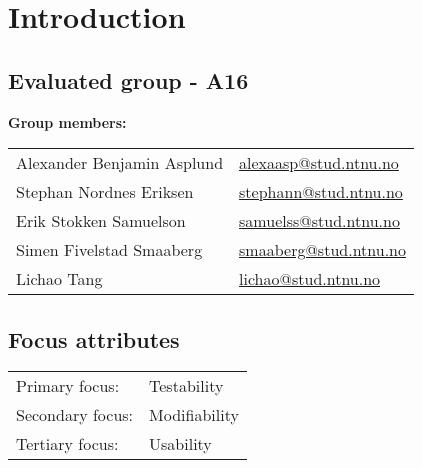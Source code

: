 \section{Introduction}

\subsection{Evaluated group - A16}
{\bf Group members:} \\

\begin{tabular}{p{} p{} }
Alexander Benjamin Asplund & \href{mailto:alexaasp@stud.ntnu.no}{alexaasp@stud.ntnu.no} \\
Stephan Nordnes Eriksen & \href{mailto:stephann@stud.ntnu.no}{stephann@stud.ntnu.no} \\
Erik Stokken Samuelson & \href{mailto:samuelss@stud.ntnu.no}{samuelss@stud.ntnu.no} \\
Simen Fivelstad Smaaberg & \href{mailto:smaaberg@stud.ntnu.no}{smaaberg@stud.ntnu.no} \\
Lichao Tang & \href{mailto:lichao@stud.ntnu.no}{lichao@stud.ntnu.no} \\
\end{tabular}

\subsection{Focus attributes}
\begin{tabular}{p{} p{} }
Primary focus: & Testability \\
Secondary focus: & Modifiability \\
Tertiary focus: & Usability \\
\end{tabular}






